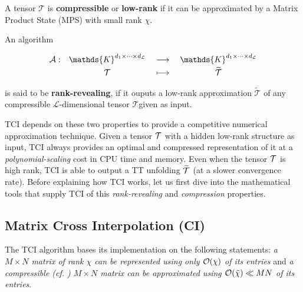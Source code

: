 \begin{definition}
	A tensor $\mathcal{T}$ is {\normalfont \textbf{compressible}} or {\normalfont \textbf{low-rank}} if it can be approximated by a Matrix Product State (MPS) with small rank $\chi$.
	\label{def:compresstensor}
\end{definition}

\begin{definition}
	An algorithm 
	
	\[
		\renewcommand{\arraystretch}{1.1}%
		\begin{array}{r c >{{}}c<{{}} c} 
		\mathcal{A}: &
		\mathds{K}^{d_1 \times \dots \times d_\mathcal{L}} &
		\longrightarrow &
		\mathds{K}^{d_1 \times \dots \times d_\mathcal{L}} \\[2pt]
		& \mathcal{T} &
		\longmapsto &
		\widetilde{\mathcal{T}}
		\end{array}
	\]

	is said to be {\normalfont \textbf{rank-revealing}}, if it ouputs a low-rank approximation $\widetilde{\mathcal{T}}$ of any compressible $\mathcal{L}$-dimensional tensor $\mathcal{T}$\footnotemark given as input.
	\label{def:rkralg}
\end{definition}

TCI depends on these two properties to provide a competitive numerical approximation technique. Given a tensor $\mathcal{T}$ with a hidden low-rank structure as input, TCI always provides an optimal and compressed representation of it at a \textit{polynomial-scaling} cost in CPU time and memory. Even when the tensor $\mathcal{T}$ is high rank, TCI is able to output a TT unfolding $\widetilde{\mathcal{T}}$ (at a slower convergence rate). Before explaining how TCI works, let us first dive into the mathematical tools that supply TCI of this \textit{rank-revealing} and \textit{compression} properties.


\subsection{Matrix Cross Interpolation (CI)}
The TCI algorithm bases its implementation on the following statements: \textit{a $M\times N$ matrix of rank $\chi$ can be represented using only $\mathcal{O}(\chi)$ of its entries} and \textit{a compressible (cf. ) $M\times N$ matrix can be approximated using  $\mathcal{O}({\tilde \chi}) \ll MN$ of its entries}.

